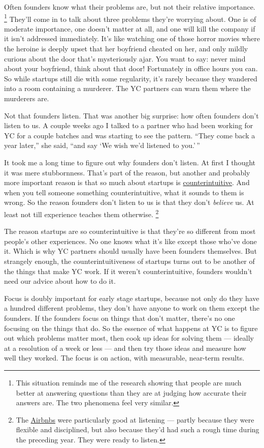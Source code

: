 \documentclass[12pt]{book}
\begin{document}
Often founders know what their problems are, but not their relative
importance. \footnote{This situation reminds me of the research showing that people
are much better at answering questions than they are at judging how
accurate their answers are. The two phenomena feel very similar.} They'll come in to talk about three
problems they're worrying about. One is of moderate importance, one
doesn't matter at all, and one will kill the company if it isn't
addressed immediately. It's like watching one of those horror movies
where the heroine is deeply upset that her boyfriend cheated on her, and
only mildly curious about the door that's mysteriously ajar. You want to
say: never mind about your boyfriend, think about that door! Fortunately
in office hours you can. So while startups still die with some
regularity, it's rarely because they wandered into a room containing a
murderer. The YC partners can warn them where the murderers are.

Not that founders listen. That was another big surprise: how often
founders don't listen to us. A couple weeks ago I talked to a partner
who had been working for YC for a couple batches and was starting to see
the pattern. ``They come back a year later,'' she said, ``and say `We
wish we'd listened to you.'\,''

It took me a long time to figure out why founders don't listen. At first
I thought it was mere stubbornness. That's part of the reason, but
another and probably more important reason is that so much about
startups is \href{before.html}{counterintuitive}. And when you tell
someone something counterintuitive, what it sounds to them is wrong. So
the reason founders don't listen to us is that they don't \emph{believe}
us. At least not till experience teaches them otherwise.
\footnote{The \href{airbnbs.html}{Airbnbs} were particularly good at
listening --- partly because they were flexible and disciplined, but
also because they'd had such a rough time during the preceding year.
They were ready to listen.}

The reason startups are so counterintuitive is that they're so different
from most people's other experiences. No one knows what it's like except
those who've done it. Which is why YC partners should usually have been
founders themselves. But strangely enough, the counterintuitiveness of
startups turns out to be another of the things that make YC work. If it
weren't counterintuitive, founders wouldn't need our advice about how to
do it.

Focus is doubly important for early stage startups, because not only do
they have a hundred different problems, they don't have anyone to work
on them except the founders. If the founders focus on things that don't
matter, there's no one focusing on the things that do. So the essence of
what happens at YC is to figure out which problems matter most, then
cook up ideas for solving them --- ideally at a resolution of a week or
less --- and then try those ideas and measure how well they worked. The
focus is on action, with measurable, near-term results.
\end{document}
